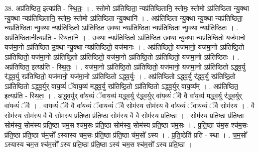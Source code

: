\documentclass[17pt]{extarticle}
\begin{document}
38. अप्र॑तिष्ठित॒ इत्यप्र॑ति - स्थि॒तः॒ । . स्तोमो ऽप्र॑तिष्ठिता॒ न्यप्र॑तिष्ठितानि॒ स्तोमः॒ स्तोमो ऽप्र॑तिष्ठिता न्यु॒क्था न्यु॒क्था न्यप्र॑तिष्ठितानि॒ स्तोमः॒ स्तोमो ऽप्र॑तिष्ठिता न्यु॒क्थानि॑ । . अप्र॑तिष्ठिता न्यु॒क्था न्यु॒क्था न्यप्र॑तिष्ठिता॒ न्यप्र॑तिष्ठिता न्यु॒क्था न्यप्र॑तिष्ठि॒तो ऽप्र॑तिष्ठित उ॒क्था न्यप्र॑तिष्ठिता॒ न्यप्र॑तिष्ठिता न्यु॒क्था न्यप्र॑तिष्ठितः । . अप्र॑तिष्ठिता॒नीत्यप्र॑ति - स्थि॒ता॒नि॒ । . उ॒क्था न्यप्र॑तिष्ठि॒तो ऽप्र॑तिष्ठित उ॒क्था न्यु॒क्था न्यप्र॑तिष्ठितो॒ यज॑मानो॒ यज॑मा॒नो ऽप्र॑तिष्ठित उ॒क्था न्यु॒क्था न्यप्र॑तिष्ठितो॒ यज॑मानः । . अप्र॑तिष्ठितो॒ यज॑मानो॒ यज॑मा॒नो ऽप्र॑तिष्ठि॒तो ऽप्र॑तिष्ठितो॒ यज॑मा॒नो ऽप्र॑तिष्ठि॒तो ऽप्र॑तिष्ठितो॒ यज॑मा॒नो ऽप्र॑तिष्ठि॒तो ऽप्र॑तिष्ठितो॒ यज॑मा॒नो ऽप्र॑तिष्ठितः । . अप्र॑तिष्ठित॒ इत्यप्र॑ति - स्थि॒तः॒ । . यज॑मा॒नो ऽप्र॑तिष्ठि॒तो ऽप्र॑तिष्ठितो॒ यज॑मानो॒ यज॑मा॒नो ऽप्र॑तिष्ठितो ऽद्ध्व॒र्यु र॑द्ध्व॒र्यु रप्र॑तिष्ठितो॒ यज॑मानो॒ यज॑मा॒नो ऽप्र॑तिष्ठितो ऽद्ध्व॒र्युः । . अप्र॑तिष्ठितो ऽद्ध्व॒र्यु र॑द्ध्व॒र्यु रप्र॑तिष्ठि॒तो ऽप्र॑तिष्ठितो ऽद्ध्व॒र्युर् वा॑य॒व्यं॑ ॅवाय॒व्य॑ मद्ध्व॒र्यु रप्र॑तिष्ठि॒तो ऽप्र॑तिष्ठितो ऽद्ध्व॒र्युर् वा॑य॒व्य᳚म् । . अप्र॑तिष्ठित॒ इत्यप्र॑ति - स्थि॒तः॒ । . अ॒द्ध्व॒र्युर् वा॑य॒व्यं॑ ॅवाय॒व्य॑ मद्ध्व॒र्यु र॑द्ध्व॒र्युर् वा॑य॒व्यं॑ ॅवै वै वा॑य॒व्य॑ मद्ध्व॒र्यु र॑द्ध्व॒र्युर् वा॑य॒व्यं॑ ॅवै । . वा॒य॒व्यं॑ ॅवै वै वा॑य॒व्यं॑ ॅवाय॒व्यं॑ ॅवै सोम॑स्य॒ सोम॑स्य॒ वै वा॑य॒व्यं॑ ॅवाय॒व्यं॑ ॅवै सोम॑स्य । . वै सोम॑स्य॒ सोम॑स्य॒ वै वै सोम॑स्य प्रति॒ष्ठा प्र॑ति॒ष्ठा सोम॑स्य॒ वै वै सोम॑स्य प्रति॒ष्ठा । . सोम॑स्य प्रति॒ष्ठा प्र॑ति॒ष्ठा सोम॑स्य॒ सोम॑स्य प्रति॒ष्ठा च॑म॒स श्च॑म॒सः प्र॑ति॒ष्ठा सोम॑स्य॒ सोम॑स्य प्रति॒ष्ठा च॑म॒सः । . प्र॒ति॒ष्ठा च॑म॒स श्च॑म॒सः प्र॑ति॒ष्ठा प्र॑ति॒ष्ठा च॑म॒सो᳚ ऽस्यास्य चम॒सः प्र॑ति॒ष्ठा प्र॑ति॒ष्ठा च॑म॒सो᳚ ऽस्य । . प्र॒ति॒ष्ठेति॑ प्रति - स्था । . च॒म॒सो᳚ ऽस्यास्य चम॒स श्च॑म॒सो᳚ ऽस्य प्रति॒ष्ठा प्र॑ति॒ष्ठा ऽस्य॑ चम॒स श्च॑म॒सो᳚ ऽस्य प्रति॒ष्ठा । \newline
\end{document}
